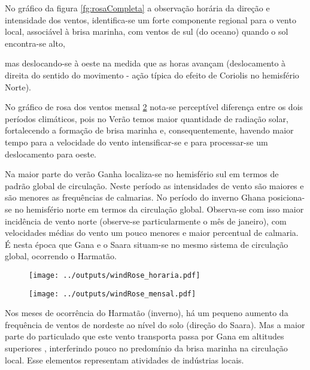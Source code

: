 No gráfico da figura \ref{fg:rosaCompleta}%
 a observação horária da direção e 
intensidade dos ventos, identifica-se um forte componente regional para o vento local, associável à brisa marinha, com ventos de sul (do oceano) quando o sol encontra-se alto,%

 mas deslocando-se à oeste na medida que as horas avançam (deslocamento à direita do sentido do movimento - ação típica do efeito de Coriolis no hemisfério Norte). 

No gráfico de rosa dos ventos mensal \ref{fig:windRose_mensal}
 nota-se 
perceptível diferença entre os dois períodos climáticos, 
pois no Verão temos maior quantidade de radiação solar, fortalecendo a 
formação de brisa marinha e, consequentemente, havendo maior tempo para a velocidade do vento intensificar-se e para processar-se um deslocamento para oeste.

Na maior parte do verão Ganha localiza-se no hemisfério sul em termos de padrão global 
de circulação. Neste período as intensidades de vento são maiores e são menores as 
frequências de calmarias. No período do inverno Ghana posiciona-se no hemisfério
 norte em termos da circulação global. 
Observa-se com isso maior incidência de vento norte (observe-se particularmente o mês 
de janeiro), com velocidades médias do vento um pouco menores e maior percentual de 
calmaria. É nesta época que Gana e o Saara situam-se no mesmo sistema de circulação 
global, ocorrendo o Harmatão. 

\begin{figure}[H]
  \centering
  \texttt{[image: ../outputs/windRose\_horaria.pdf]}
  \caption{ \citep{carslaw2012} \label{fig:windRose_horaria}}%
\end{figure}

\begin{figure}[H]
  \centering
  \texttt{[image: ../outputs/windRose\_mensal.pdf]}
  \caption{ \citep{carslaw2012} \label{fig:windRose_mensal}}
\end{figure}

Nos meses de ocorrência do Harmatão (inverno), há um pequeno aumento da frequência de ventos de nordeste ao nível do solo (direção do Saara). Mas a maior parte do particulado que este vento transporta passa por Gana 
em altitudes superiores \citep{breuning2005}, interferindo pouco no predomínio da brisa marinha na circulação local.%
%
Esse elementos representam atividades de indústrias locais. 



%
%
%
